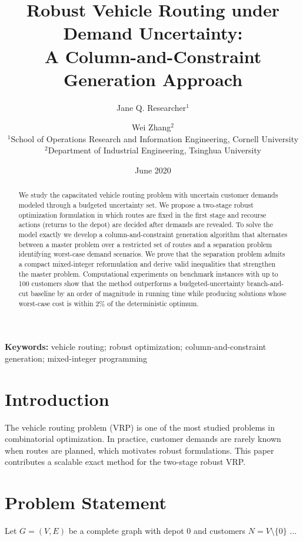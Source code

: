 \documentclass[11pt]{article}
\title{Robust Vehicle Routing under Demand Uncertainty:\\ A Column-and-Constraint Generation Approach}
\author{Jane Q. Researcher$^{1}$ \and Wei Zhang$^{2}$\\
$^{1}$School of Operations Research and Information Engineering, Cornell University\\
$^{2}$Department of Industrial Engineering, Tsinghua University}
\date{June 2020}
\begin{document}
\maketitle
\begin{abstract}
We study the capacitated vehicle routing problem with uncertain customer demands modeled through a budgeted uncertainty set. We propose a two-stage robust optimization formulation in which routes are fixed in the first stage and recourse actions (returns to the depot) are decided after demands are revealed. To solve the model exactly we develop a column-and-constraint generation algorithm that alternates between a master problem over a restricted set of routes and a separation problem identifying worst-case demand scenarios. We prove that the separation problem admits a compact mixed-integer reformulation and derive valid inequalities that strengthen the master problem. Computational experiments on benchmark instances with up to 100 customers show that the method outperforms a budgeted-uncertainty branch-and-cut baseline by an order of magnitude in running time while producing solutions whose worst-case cost is within 2\% of the deterministic optimum.
\end{abstract}
\noindent\textbf{Keywords:} vehicle routing; robust optimization; column-and-constraint generation; mixed-integer programming
\section{Introduction}
The vehicle routing problem (VRP) is one of the most studied problems in combinatorial optimization. In practice, customer demands are rarely known when routes are planned, which motivates robust formulations. This paper contributes a scalable exact method for the two-stage robust VRP.
\section{Problem Statement}
Let $G=(V,E)$ be a complete graph with depot $0$ and customers $N=V\setminus\{0\}$ ...
\end{document}
